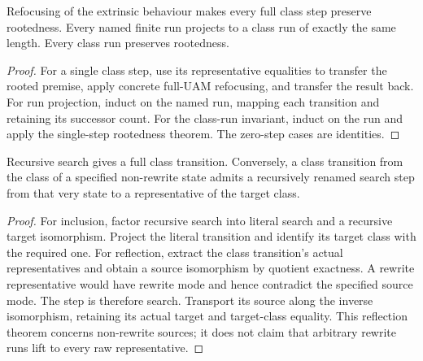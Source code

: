 \begin{lemma}
Refocusing of the extrinsic behaviour makes every full class step preserve
rootedness. Every named finite run projects to a class run of exactly the same
length. Every class run preserves rootedness.
\end{lemma}
\begin{proof}
For a single class step, use its representative equalities to transfer the
rooted premise, apply concrete full-UAM refocusing, and transfer the result
back. For run projection, induct on the named run, mapping each transition and
retaining its successor count. For the class-run invariant, induct on the run
and apply the single-step rootedness theorem. The zero-step cases are identities.
\end{proof}




\begin{lemma}
Recursive search gives a full class transition. Conversely, a class transition
from the class of a specified non-rewrite state admits a recursively renamed
search step from that very state to a representative of the target class.
\end{lemma}
\begin{proof}
For inclusion, factor recursive search into literal search and a recursive
target isomorphism. Project the literal transition and identify its target
class with the required one. For reflection, extract the class transition's
actual representatives and obtain a source isomorphism by quotient exactness.
A rewrite representative would have rewrite mode and hence contradict the
specified source mode. The step is therefore search. Transport its source
along the inverse isomorphism, retaining its actual target and target-class
equality. This reflection theorem concerns non-rewrite sources; it does not
claim that arbitrary rewrite runs lift to every raw representative.
\end{proof}



